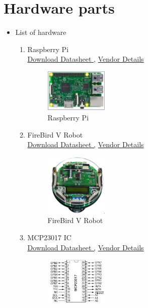 \documentclass[a4paper,12pt,oneside]{book}
\begin{document}
\section{Hardware parts}
\begin{itemize}
	\item List of hardware 
	\begin{enumerate}
		\item Raspberry Pi \\
		\href{https://www.raspberrypi.org/documentation/.../RPI-CM-DATASHEET-V1_0.pdf
		} {Download Datasheet ,}
		\href{http://www.amazon.in/Raspberry-Pi-Model-1GB-Complete/dp/B00T2U7R7I} {Vendor Details}
		\begin{figure}[h]
			\hspace{4cm}
			\includegraphics[width=0.3\textwidth]{RPi}
			\caption{ Raspberry Pi}
		\end{figure}
	\item FireBird V Robot \\
	\href{www.nex-robotics.com/fire-bird-v-atmega2560/fire-bird-v-atmega2560.html} {Download Datasheet ,}
	\href{http://www.nex-robotics.com/products/fire-bird-v-robots/fire-bird-v-atmega2560-robotic-research-platform.html} {Vendor Details}
\begin{figure}[h]
	\hspace{4cm}
	\includegraphics[width=0.3\textwidth]{robot}
	\caption{FireBird V Robot}
\end{figure}
	\item MCP23017 IC     \\
	\href{ww1.microchip.com/downloads/en/DeviceDoc/21952b.pdf
	} {Download Datasheet ,}
	\href{http://www.smddevices.com/} {Vendor Details}
		\begin{figure}[h]
		\hspace{4cm}
		\includegraphics[width=0.3\textwidth]{mcp23017}

\end{figure}
\end{enumerate}
\end{itemize}
\end{document}
